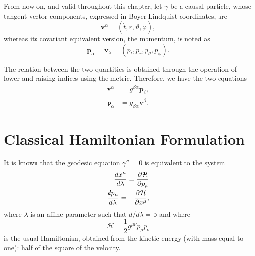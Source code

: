 From now on, and valid throughout this chapter, let $\gamma$ be a causal particle, whose tangent vector components, expressed in Boyer-Lindquist coordinates, are
\begin{equation}
	\label{eq:blcoord1}
	\mathbf{v}^\alpha = (\dot{t}, \dot{r}, \dot{\vartheta}, \dot{\varphi}),
\end{equation}
whereas its covariant equivalent version, the momentum, is noted as
\begin{equation}
	\label{eq:blcoord2}
	\mathbf{p}_\alpha = \mathbf{v}_\alpha = (p_t, p_r, p_\vartheta, p_\varphi).
\end{equation}

The relation between the two quantities is obtained through the operation of lower and raising indices using the metric. Therefore, we have the two equations
\begin{align}
	\label{eq:raisep}
	\mathbf{v}^\alpha &= g^{\beta\alpha} \mathbf{p}_\beta, \\
	\label{eq:lowerv}
	\mathbf{p}_\alpha &= g_{\beta\alpha} \mathbf{v}^\beta.
\end{align}

\section{Classical Hamiltonian Formulation}

It is known \cite[Sec. 33.5]{thorne73} that the geodesic equation $\gamma'' = 0$ is equivalent to the system
\begin{align*}
	\frac{dx^\mu}{d\lambda} = \frac{\partial^{} \mathcal{H}}{\partial p_\mu} \\
	\frac{dp_\mu}{d\lambda} = - \frac{\partial^{} \mathcal{H}}{\partial x^\mu},
\end{align*}
where $\lambda$ is an affine parameter such that $d/d\lambda = \mathbb{p}$ and where
\[
	\mathcal{H} = \frac{1}{2} g^{\mu\nu} p_\mu p_\nu
\]
is the usual Hamiltonian, obtained from the kinetic energy (with mass equal to one): half of the square of the velocity.

